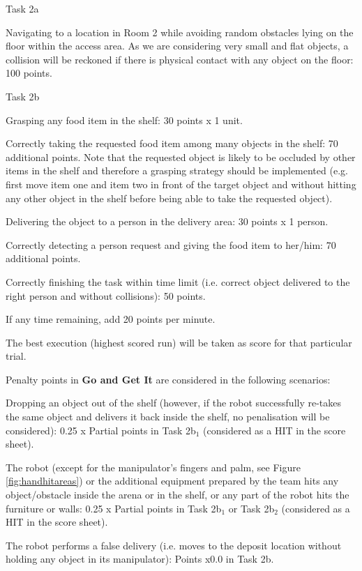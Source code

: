 \documentclass{article}
\newcommand{\SubItem}[1]{
    {\setlength\itemindent{15pt} \item[-] #1}
}
\begin{document}
\begin{itemize}
    \item Task 2a
        \SubItem{Navigating to a location in Room 2 while avoiding random obstacles lying on the floor within the access area. As we are considering very small and flat objects, a collision will be reckoned if there is physical contact with any object on the floor: 100 points.}
    \item Task 2b
        \SubItem{Grasping any food item in the shelf: 30 points x 1 unit.}
        \SubItem{Correctly taking the requested food item among many objects in the shelf: 70 additional points. Note that the requested object is likely to be occluded by other items in the shelf and therefore a grasping strategy should be implemented (e.g. first move item one and item two in front of the target object and without hitting any other object in the shelf before being able to take the requested object).}
        \SubItem{Delivering the object to a person in the delivery area: 30 points x 1 person.}
        \SubItem{Correctly detecting a person request and giving the food item to her/him: 70 additional points.}
        \SubItem{Correctly finishing the task within time limit (i.e. correct object delivered to the right person and without collisions): 50 points.}
        \SubItem{If any time remaining, add 20 points per minute.}
    \item The best execution (highest scored run) will be taken as score for that particular trial.
\end{itemize}

\begin{itemize}
    \item Penalty points in \textbf{Go and Get It} are considered in the following scenarios:
        \SubItem{Dropping an object out of the shelf (however, if the robot successfully re-takes the same object and delivers it back inside the shelf, no penalisation will be considered): 0.25 x Partial points in Task 2b$_1$ (considered as a HIT in the score sheet).}
        \SubItem{The robot (except for the manipulator's fingers and palm, see Figure \ref{fig:handhitareas}) or the additional equipment prepared by the team hits any object/obstacle inside the arena or in the shelf, or any part of the robot hits the furniture or walls: 0.25 x Partial points in Task 2b$_1$ or Task 2b$_2$ (considered as a HIT in the score sheet).}
        \SubItem{The robot performs a false delivery (i.e. moves to the deposit location without holding any object in its manipulator): Points x0.0 in Task 2b.}
\end{itemize}
\end{document}

